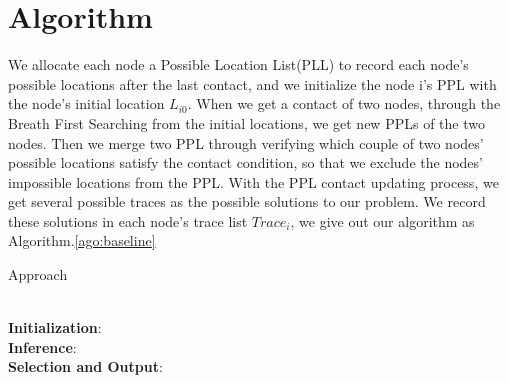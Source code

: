 \section{Algorithm}
\label{sec:algo}
We allocate each node a Possible Location List(PLL) to record each node's possible locations after the last contact, and we initialize the node i's PPL with the node's initial location $L_{i0}$. When we get a contact of two nodes, through the Breath First Searching from the initial locations, we get new PPLs of the two nodes. Then we merge two PPL through verifying which couple of two nodes' possible locations satisfy the contact condition, so that we exclude the nodes' impossible locations from the PPL. With the PPL contact updating process, we get several possible traces as the possible solutions to our problem. We record these solutions in each node's trace list $Trace_i$, we give out our algorithm as Algorithm.\ref{ago:baseline}
\begin{algorithm}[htbp]
\caption{Approach}
\begin{algorithmic}[1]\label{ago:baseline}
\\
\textbf{Initialization}:
\ENDFOR \\
\textbf{Inference}:
    \ENDIF
    \ENDIF
{}
\ENDFOR \\
\textbf{Selection and Output}:
\ENDFOR
\end{algorithmic}
\end{algorithm}
